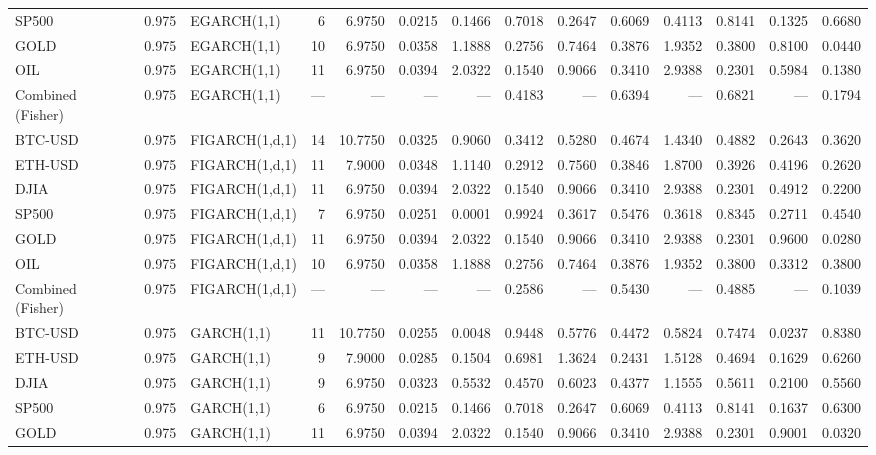 \begin{table}[ht]
\begin{tabular}{lllrrrrrrrrrrr}
SP500 & 0.975 & EGARCH(1,1) & 6 & 6.9750 & 0.0215 & 0.1466 & 0.7018 & 0.2647 & 0.6069 & 0.4113 & 0.8141 & 0.1325 & 0.6680 \\
GOLD & 0.975 & EGARCH(1,1) & 10 & 6.9750 & 0.0358 & 1.1888 & 0.2756 & 0.7464 & 0.3876 & 1.9352 & 0.3800 & 0.8100 & 0.0440 \\
OIL & 0.975 & EGARCH(1,1) & 11 & 6.9750 & 0.0394 & 2.0322 & 0.1540 & 0.9066 & 0.3410 & 2.9388 & 0.2301 & 0.5984 & 0.1380 \\
Combined (Fisher) & 0.975 & EGARCH(1,1) & — & — & — & — & 0.4183 & — & 0.6394 & — & 0.6821 & — & 0.1794 \\
BTC-USD & 0.975 & FIGARCH(1,d,1) & 14 & 10.7750 & 0.0325 & 0.9060 & 0.3412 & 0.5280 & 0.4674 & 1.4340 & 0.4882 & 0.2643 & 0.3620 \\
ETH-USD & 0.975 & FIGARCH(1,d,1) & 11 & 7.9000 & 0.0348 & 1.1140 & 0.2912 & 0.7560 & 0.3846 & 1.8700 & 0.3926 & 0.4196 & 0.2620 \\
DJIA & 0.975 & FIGARCH(1,d,1) & 11 & 6.9750 & 0.0394 & 2.0322 & 0.1540 & 0.9066 & 0.3410 & 2.9388 & 0.2301 & 0.4912 & 0.2200 \\
SP500 & 0.975 & FIGARCH(1,d,1) & 7 & 6.9750 & 0.0251 & 0.0001 & 0.9924 & 0.3617 & 0.5476 & 0.3618 & 0.8345 & 0.2711 & 0.4540 \\
GOLD & 0.975 & FIGARCH(1,d,1) & 11 & 6.9750 & 0.0394 & 2.0322 & 0.1540 & 0.9066 & 0.3410 & 2.9388 & 0.2301 & 0.9600 & 0.0280 \\
OIL & 0.975 & FIGARCH(1,d,1) & 10 & 6.9750 & 0.0358 & 1.1888 & 0.2756 & 0.7464 & 0.3876 & 1.9352 & 0.3800 & 0.3312 & 0.3800 \\
Combined (Fisher) & 0.975 & FIGARCH(1,d,1) & — & — & — & — & 0.2586 & — & 0.5430 & — & 0.4885 & — & 0.1039 \\
BTC-USD & 0.975 & GARCH(1,1) & 11 & 10.7750 & 0.0255 & 0.0048 & 0.9448 & 0.5776 & 0.4472 & 0.5824 & 0.7474 & 0.0237 & 0.8380 \\
ETH-USD & 0.975 & GARCH(1,1) & 9 & 7.9000 & 0.0285 & 0.1504 & 0.6981 & 1.3624 & 0.2431 & 1.5128 & 0.4694 & 0.1629 & 0.6260 \\
DJIA & 0.975 & GARCH(1,1) & 9 & 6.9750 & 0.0323 & 0.5532 & 0.4570 & 0.6023 & 0.4377 & 1.1555 & 0.5611 & 0.2100 & 0.5560 \\
SP500 & 0.975 & GARCH(1,1) & 6 & 6.9750 & 0.0215 & 0.1466 & 0.7018 & 0.2647 & 0.6069 & 0.4113 & 0.8141 & 0.1637 & 0.6300 \\
GOLD & 0.975 & GARCH(1,1) & 11 & 6.9750 & 0.0394 & 2.0322 & 0.1540 & 0.9066 & 0.3410 & 2.9388 & 0.2301 & 0.9001 & 0.0320 \\

\end{tabular}
\end{table}
